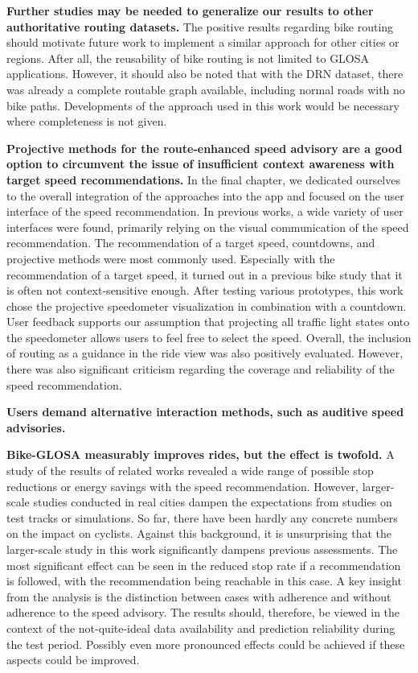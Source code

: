 \textbf{\color{cidarkblue}Further studies may be needed to generalize our results to other authoritative routing datasets.} The positive results regarding bike routing should motivate future work to implement a similar approach for other cities or regions. After all, the reusability of bike routing is not limited to GLOSA applications. However, it should also be noted that with the DRN dataset, there was already a complete routable graph available, including normal roads with no bike paths. Developments of the approach used in this work would be necessary where completeness is not given.

\textbf{\color{cidarkblue}Projective methods for the route-enhanced speed advisory are a good option to circumvent the issue of insufficient context awareness with target speed recommendations.} In the final chapter, we dedicated ourselves to the overall integration of the approaches into the app and focused on the user interface of the speed recommendation. In previous works, a wide variety of user interfaces were found, primarily relying on the visual communication of the speed recommendation. The recommendation of a target speed, countdowns, and projective methods were most commonly used. Especially with the recommendation of a target speed, it turned out in a previous bike study that it is often not context-sensitive enough. After testing various prototypes, this work chose the projective speedometer visualization in combination with a countdown. User feedback supports our assumption that projecting all traffic light states onto the speedometer allows users to feel free to select the speed. Overall, the inclusion of routing as a guidance in the ride view was also positively evaluated. However, there was also significant criticism regarding the coverage and reliability of the speed recommendation.

\textbf{\color{cidarkblue}Users demand alternative interaction methods, such as auditive speed advisories.}

\textbf{\color{cidarkblue}Bike-GLOSA measurably improves rides, but the effect is twofold.} A study of the results of related works revealed a wide range of possible stop reductions or energy savings with the speed recommendation. However, larger-scale studies conducted in real cities dampen the expectations from studies on test tracks or simulations. So far, there have been hardly any concrete numbers on the impact on cyclists. Against this background, it is unsurprising that the larger-scale study in this work significantly dampens previous assessments. The most significant effect can be seen in the reduced stop rate if a recommendation is followed, with the recommendation being reachable in this case. A key insight from the analysis is the distinction between cases with adherence and without adherence to the speed advisory. The results should, therefore, be viewed in the context of the not-quite-ideal data availability and prediction reliability during the test period. Possibly even more pronounced effects could be achieved if these aspects could be improved.

